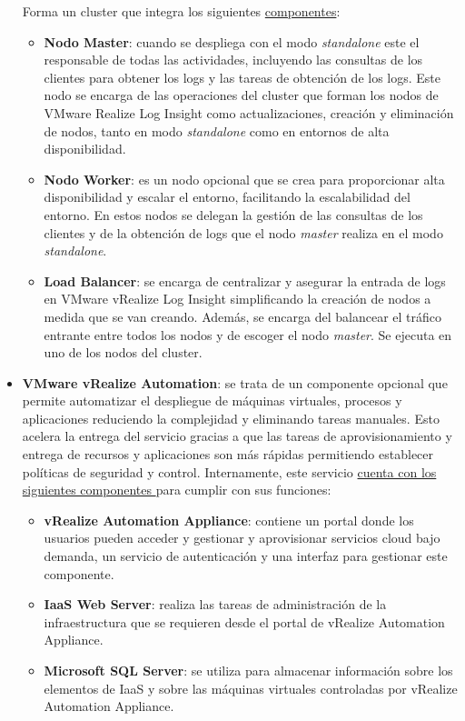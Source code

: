 \begin{itemize}
    Forma un cluster que integra los siguientes \underline{componentes}:
    \begin{itemize}
        \item \textbf{Nodo Master}: cuando se despliega con el modo \textit{standalone} este el responsable de todas las actividades, incluyendo las consultas de los clientes para obtener los logs y las tareas de obtención de los logs. Este nodo se encarga de las operaciones del cluster que forman los nodos de VMware Realize Log Insight como actualizaciones, creación y eliminación de nodos, tanto en modo \textit{standalone} como en entornos de alta disponibilidad. 
        
        \item \textbf{Nodo Worker}: es un nodo opcional que se crea para proporcionar alta disponibilidad y escalar el entorno, facilitando la escalabilidad del entorno. En estos nodos se delegan la gestión de las consultas de los clientes y de la obtención de logs que el nodo \textit{master} realiza en el modo \textit{standalone}.
        \item \textbf{Load Balancer}: se encarga de centralizar y asegurar la entrada de logs en VMware vRealize Log Insight simplificando la creación de nodos a medida que se van creando. Además, se encarga del balancear el tráfico entrante entre todos los nodos y de escoger el nodo \textit{master}. Se ejecuta en uno de los nodos del cluster.
    \end{itemize}
    
    \item \textbf{VMware vRealize Automation}: se trata de un componente opcional que permite automatizar el despliegue de máquinas virtuales, procesos y aplicaciones reduciendo la complejidad y eliminando tareas manuales. Esto acelera la entrega del servicio gracias a que las tareas de aprovisionamiento y entrega de recursos y aplicaciones son más rápidas permitiendo establecer políticas de seguridad y control. Internamente, este servicio \underline{cuenta con los siguientes componentes \cite{vRealizeAutomation}} para cumplir con sus funciones:
    \begin{itemize}
        \item \textbf{vRealize Automation Appliance}: contiene un portal donde los usuarios pueden acceder y gestionar y aprovisionar servicios cloud bajo demanda, un servicio de autenticación y una interfaz para gestionar este componente. 
        \item \textbf{IaaS Web Server}: realiza las tareas de administración de la infraestructura que se requieren desde el portal de vRealize Automation Appliance.
        \item \textbf{Microsoft SQL Server}: se utiliza para almacenar información sobre los elementos de IaaS y sobre las máquinas virtuales controladas por vRealize Automation Appliance.
    \end{itemize}
\end{itemize}

